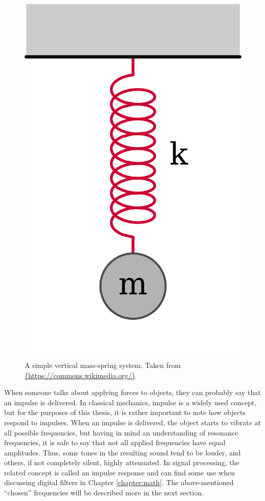 \begin{figure}[h]
	\centering
	\includegraphics[height=0.3\textheight]{include/vertical_mass_spring}
	\caption[A simple vertical mass-spring system]{A simple vertical mass-spring system. Taken from \url{{https://commons.wikimedia.org/}}}
	\label{img:vertical_mass_spring}
\end{figure}

When someone talks about applying forces to objects, they can probably say that an impulse is delivered. In classical mechanics, impulse is a widely used concept, but for the purposes of this thesis, it is rather important to note how objects respond to impulses. When an impulse is delivered, the object starts to vibrate at all possible frequencies, but having in mind an understanding of resonance frequencies, it is safe to say that not all applied frequencies have equal amplitudes. Thus, some tones in the resulting sound tend to be louder, and others, if not completely silent, highly attenuated. In signal processing, the related concept is called an impulse response and can find some use when discussing digital filters in Chapter \ref{chapter:math}. The above-mentioned “chosen” frequencies will be described more in the next section.\\

